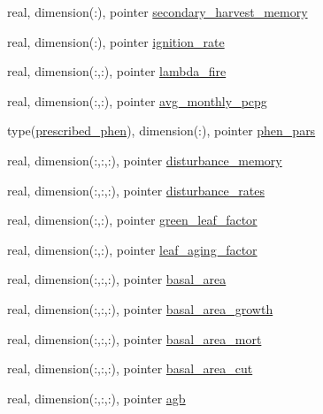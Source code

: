 \begin{DoxyCompactItemize}
\item 
real, dimension(\+:), pointer \hyperlink{structed__state__vars_1_1polygontype_ab5a9a1a94b8a6ceb0c242cddb0d6b29c}{secondary\+\_\+harvest\+\_\+memory}
\item 
real, dimension(\+:), pointer \hyperlink{structed__state__vars_1_1polygontype_a72e0b67bb746146d670e9c1e0d9148e2}{ignition\+\_\+rate}
\item 
real, dimension(\+:,\+:), pointer \hyperlink{structed__state__vars_1_1polygontype_a40d82b40c0f0dcd49343e208227a36b5}{lambda\+\_\+fire}
\item 
real, dimension(\+:,\+:), pointer \hyperlink{structed__state__vars_1_1polygontype_a918aab56bb72fea95d57196cea86ae11}{avg\+\_\+monthly\+\_\+pcpg}
\item 
type(\hyperlink{structphenology__coms_1_1prescribed__phen}{prescribed\+\_\+phen}), dimension(\+:), pointer \hyperlink{structed__state__vars_1_1polygontype_af75f87338f241dac65fed37133c7e3a6}{phen\+\_\+pars}
\item 
real, dimension(\+:,\+:,\+:), pointer \hyperlink{structed__state__vars_1_1polygontype_ae8336319c14edd8c09e4619ca37bdc3e}{disturbance\+\_\+memory}
\item 
real, dimension(\+:,\+:,\+:), pointer \hyperlink{structed__state__vars_1_1polygontype_ab1d9b9b3968206399e51235e2bf79bf6}{disturbance\+\_\+rates}
\item 
real, dimension(\+:,\+:), pointer \hyperlink{structed__state__vars_1_1polygontype_a4e73b012647a4b764bb54d7ee2624714}{green\+\_\+leaf\+\_\+factor}
\item 
real, dimension(\+:,\+:), pointer \hyperlink{structed__state__vars_1_1polygontype_ac17475f15e2f6833d64ffbaf11e006c4}{leaf\+\_\+aging\+\_\+factor}
\item 
real, dimension(\+:,\+:,\+:), pointer \hyperlink{structed__state__vars_1_1polygontype_aca5e0482a88b91c98beeb2d9e5927fba}{basal\+\_\+area}
\item 
real, dimension(\+:,\+:,\+:), pointer \hyperlink{structed__state__vars_1_1polygontype_a7238e3b3255c3c503875cc190ede1ea3}{basal\+\_\+area\+\_\+growth}
\item 
real, dimension(\+:,\+:,\+:), pointer \hyperlink{structed__state__vars_1_1polygontype_a93ae108aa1dd7dcd1d8a047402d893d2}{basal\+\_\+area\+\_\+mort}
\item 
real, dimension(\+:,\+:,\+:), pointer \hyperlink{structed__state__vars_1_1polygontype_a49e8dcd6d3eed439989a68871e8484f4}{basal\+\_\+area\+\_\+cut}
\item 
real, dimension(\+:,\+:,\+:), pointer \hyperlink{structed__state__vars_1_1polygontype_ae956704544a7eceb2ba446d62a2aa760}{agb}

\end{DoxyCompactItemize}
